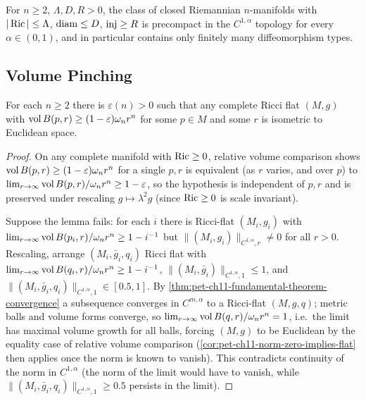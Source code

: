 \begin{corollary}
  \label{cor:pet-ch11-anderson-diffeo-finiteness-injectivity}
  For $n\ge2$, $\Lambda,D,R>0$, the class of closed Riemannian $n$-manifolds
  with $|\operatorname{Ric}|\le\Lambda$, $\operatorname{diam}\le D$, $\operatorname{inj}\ge R$ is precompact in the
  $C^{1,\alpha}$ topology for every $\alpha\in(0,1)$, and in particular
  contains only finitely many diffeomorphism types.
\end{corollary}

\subsection{Volume Pinching}

\begin{lemma}
  \label{lem:pet-ch11-anderson-volume-pinching-euclidean}
  For each $n\ge2$ there is $\varepsilon(n)>0$ such that any complete Ricci
  flat $(M,g)$ with $\operatorname{vol} B(p,r)\ge(1-\varepsilon)\omega_nr^n$ for some
  $p\in M$ and some $r$ is isometric to Euclidean space.
\end{lemma}
\begin{proof}
  On any complete manifold with $\operatorname{Ric}\ge0$, relative volume comparison shows
  $\operatorname{vol} B(p,r)\ge(1-\varepsilon)\omega_nr^n$ for a single $p,r$ is equivalent
  (as $r$ varies, and over $p$) to
  $\lim_{r\to\infty}\operatorname{vol} B(p,r)/\omega_nr^n\ge1-\varepsilon$, so the
  hypothesis is independent of $p,r$ and is preserved under rescaling
  $g\mapsto\lambda^2g$ (since $\operatorname{Ric}\ge0$ is scale invariant).

  Suppose the lemma fails: for each $i$ there is Ricci-flat $(M_i,g_i)$ with
  $\lim_{r\to\infty}\operatorname{vol} B(p_i,r)/\omega_nr^n\ge1-i^{-1}$ but
  $\|(M_i,g_i)\|_{C^{1,\alpha},r}\ne0$ for all $r>0$. Rescaling, arrange
  $(M_i,\bar g_i,q_i)$ Ricci flat with
  $\lim_{r\to\infty}\operatorname{vol} B(q_i,r)/\omega_nr^n\ge1-i^{-1}$,
  $\|(M_i,\bar g_i)\|_{C^{1,\alpha},1}\le1$, and
  $\|(M_i,\bar g_i,q_i)\|_{C^{1,\alpha},1}\in[0.5,1]$. By
  \cref{thm:pet-ch11-fundamental-theorem-convergence} a subsequence converges
  in $C^{m,\alpha}$ to a Ricci-flat $(M,g,q)$; metric balls and volume forms
  converge, so $\lim_{r\to\infty}\operatorname{vol} B(q,r)/\omega_nr^n=1$, i.e.\ the limit
  has maximal volume growth for all balls, forcing $(M,g)$ to be Euclidean by
  the equality case of relative volume comparison
  (\cref{cor:pet-ch11-norm-zero-implies-flat} then applies once the norm is
  known to vanish). This contradicts continuity of the norm in $C^{1,\alpha}$
  (the norm of the limit would have to vanish, while
  $\|(M_i,\bar g_i,q_i)\|_{C^{1,\alpha},1}\ge0.5$ persists in the limit).
\end{proof}


